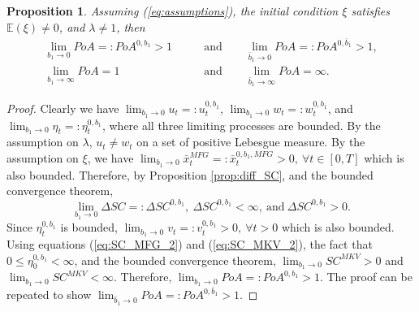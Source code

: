 \documentclass[11pt]{article}
\newtheorem{proposition}{Proposition}
\begin{document}
\begin{proposition}\label{prop:b1_b1bar}
	Assuming (\ref{eq:assumptions}), the initial condition $\xi$ satisfies $\mathbb{E}(\xi)\neq 0$, and $\lambda \neq 1$, then
	\begin{equation*}
	\begin{split}
	    \lim_{b_1 \to 0} PoA =: PoA^{0,b_1} > 1\qquad &\text{and} \qquad \lim_{\bar{b}_1 \to 0} PoA =: PoA^{0,\bar{b}_1} > 1,\\
	    \lim_{b_1 \to \infty} PoA = 1 \qquad &\text{and} \qquad\lim_{\bar{b}_1 \to \infty} PoA =\infty.
	\end{split}
	\end{equation*}
\end{proposition}
\begin{proof}
    Clearly we have $\lim_{b_1 \to 0}u_t=:u^{0,b_1}_t$, $\lim_{b_1 \to 0}w_t=:w^{0,b_1}_t$, and $\lim_{b_1 \to 0}\eta_t=:\eta^{0,b_1}_t$, where all three limiting processes are bounded. By the assumption on $\lambda$, $u_t \neq w_t$ on a set of positive Lebesgue measure. By the assumption on $\xi$, we have $\lim_{b_1 \to 0} \bar{x}^{MFG}_t=:\bar{x}^{0,b_1,MFG}_t>0,\ \forall t \in [0,T]$ which is also bounded. Therefore, by Proposition \ref{prop:diff_SC}, and the bounded convergence theorem,
    \begin{equation*}
        \lim_{b_1 \to 0} \Delta SC=:\Delta SC^{0,b_1},\  \Delta SC^{0,b_1}<\infty,\ \text{and}\ \Delta SC^{0,b_1}>0.
    \end{equation*}
    Since $\eta^{0,b_1}_t$ is bounded, $\lim_{b_1 \to 0}v_t=:v_t^{0,b_1}>0,\ \forall t>0$ which is also bounded. Using equations (\ref{eq:SC_MFG_2}) and (\ref{eq:SC_MKV_2}), the fact that $0 \leq \eta^{0,b_1}_0 < \infty$, and the bounded convergence theorem, $\lim_{b_1 \to 0} SC^{MKV}>0$ and $\lim_{b_1 \to 0} SC^{MKV}<\infty$. Therefore, $\lim_{b_1 \to 0} PoA =: PoA^{0,b_1} > 1$. The proof can be repeated to show $\lim_{\bar{b}_1 \to 0} PoA =: PoA^{0,\bar{b}_1} > 1$.
    

\end{proof}
\end{document}

